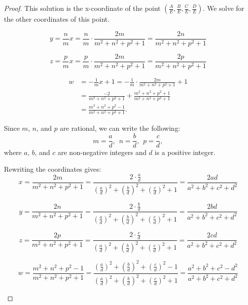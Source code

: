 \documentclass[12pt,table]{article}
\theoremstyle{definition}
\theoremstyle{remark}
\numberwithin{equation}{section}
\begin{document}
\begin{proof}
This solution is the x-coordinate of the point 
$\left(\frac{A}{E},\frac{B}{E},\frac{C}{E},\frac{D}{E}\right)$.
We solve for the other coordinates of this point.


\[y=\frac{n}{m}x=\frac{n}{m}\cdot\frac{2m}{m^2 + n^2 + p^2 +1}
=\frac{2n}{m^2 + n^2 + p^2 +1}\]

\[z=\frac{p}{m}x=\frac{p}{m}\cdot\frac{2m}
{m^2 + n^2 + p^2 +1}=\frac{2p}{m^2 + n^2 + p^2 +1}\]

\begin{align*}
    w & = -\frac{1}{m}x+1=-\frac{1}{m}\cdot\frac{2m}{m^2 + n^2 + p^2 +1}+1
\\
      & = \frac{-2}{m^2 + n^2 + p^2 +1}
       + \frac{m^2 + n^2 + p^2 +1}{m^2 + n^2 + p^2 +1}
\\
      & = \frac{m^2 + n^2 + p^2 -1}{m^2 + n^2 + p^2 +1}.
\end{align*}

Since $m$, $n$, and $p$ are rational, we can write the following:
\[
     m=\frac{a}{d}, \:\:
     n=\frac{b}{d}, \:\:
     p=\frac{c}{d},
\]
where $a$, $b$, and $c$ 
are non-negative integers and $d$ is a positive integer.



Rewriting the coordinates gives:
\[x=\frac{2m}{m^2 + n^2 + p^2 +1}
=\frac{2 \cdot \frac{a}{d}}{\left(\frac{a}{d}\right)^2+\left(\frac{b}{d}\right)^2+\left(\frac{c}{d}\right)^2+1}
=\frac{2ad}{a^2+b^2+c^2+d^2}\]

\[y=\frac{2n}{m^2 + n^2 + p^2 +1}                    
=\frac{2\cdot\frac{b}{d}}{\left(\frac{a}{d}\right)^2+\left(\frac{b}{d}\right)^2+\left(\frac{c}{d}\right)^2+1} 
=\frac{2bd}{a^2+b^2+c^2+d^2}\]

\[z=\frac{2p}{m^2 + n^2 + p^2 +1}                                               
=\frac{2\cdot\frac{c}{d}}{\left(\frac{a}{d}\right)^2+\left(\frac{b}{d}\right)^2+\left(\frac{c}{d}\right)^2+1} 
=\frac{2cd}{a^2+b^2+c^2+d^2}\]


\[w=\frac{m^2 + n^2 + p^2 -1}{m^2 + n^2 + p^2 +1}
=\frac{\left(\frac{a}{d}\right)^2+\left(\frac{b}{d}\right)^2+\left(\frac{c}{d}\right)^2-1} 
{\left(\frac{a}{d}\right)^2+\left(\frac{b}{d}\right)^2+\left(\frac{c}{d}\right)^2+1} 
=\frac{a^2+b^2+c^2-d^2}{a^2+b^2+c^2+d^2}\]






\begin{figure}
\begin{center}  
\begin{tikzpicture}



\end{tikzpicture}
\end{center}
\end{figure}
\end{proof}
\end{document}
